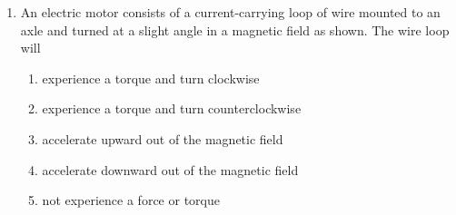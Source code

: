 \documentclass{../../../oss-classkick}
\begin{document}
\begin{multicols*}{2}
\begin{enumerate}[leftmargin=18pt,resume]
  \item An electric motor consists of a current-carrying loop of wire mounted
    to an axle and turned at a slight angle in a magnetic field as shown. The
    wire loop will
    \begin{center}
    \end{center}
    \begin{enumerate}[nosep,leftmargin=18pt,label=(\Alph*)]
    \item experience a torque and turn clockwise
    \item experience a torque and turn counterclockwise
    \item accelerate upward out of the magnetic field
    \item accelerate downward out of the magnetic field
    \item not experience a force or torque
    \end{enumerate}
  \end{enumerate}
\end{multicols*}
\newpage


\genfreedirections
\end{document}
